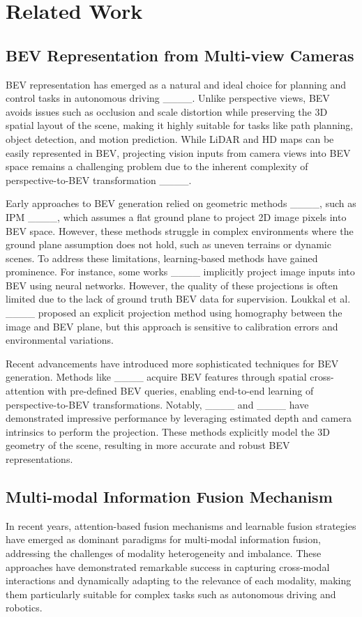 \section{Related Work}
\label{sec:related}
\subsection{BEV Representation from Multi-view Cameras}
BEV representation has emerged as a natural and ideal choice for planning and control tasks in autonomous driving ____. Unlike perspective views, BEV avoids issues such as occlusion and scale distortion while preserving the 3D spatial layout of the scene, making it highly suitable for tasks like path planning, object detection, and motion prediction. While LiDAR and HD maps can be easily represented in BEV, projecting vision inputs from camera views into BEV space remains a challenging problem due to the inherent complexity of perspective-to-BEV transformation ____.

Early approaches to BEV generation relied on geometric methods ____, such as IPM ____, which assumes a flat ground plane to project 2D image pixels into BEV space. However, these methods struggle in complex environments where the ground plane assumption does not hold, such as uneven terrains or dynamic scenes. To address these limitations, learning-based methods have gained prominence. For instance, some works ____ implicitly project image inputs into BEV using neural networks. However, the quality of these projections is often limited due to the lack of ground truth BEV data for supervision. Loukkal et al. ____ proposed an explicit projection method using homography between the image and BEV plane, but this approach is sensitive to calibration errors and environmental variations.

Recent advancements have introduced more sophisticated techniques for BEV generation. Methods like ____ acquire BEV features through spatial cross-attention with pre-defined BEV queries, enabling end-to-end learning of perspective-to-BEV transformations. Notably, ____ and ____ have demonstrated impressive performance by leveraging estimated depth and camera intrinsics to perform the projection. These methods explicitly model the 3D geometry of the scene, resulting in more accurate and robust BEV representations.

\subsection{Multi-modal Information Fusion Mechanism}
In recent years, attention-based fusion mechanisms and learnable fusion strategies have emerged as dominant paradigms for multi-modal information fusion, addressing the challenges of modality heterogeneity and imbalance. These approaches have demonstrated remarkable success in capturing cross-modal interactions and dynamically adapting to the relevance of each modality, making them particularly suitable for complex tasks such as autonomous driving and robotics.

